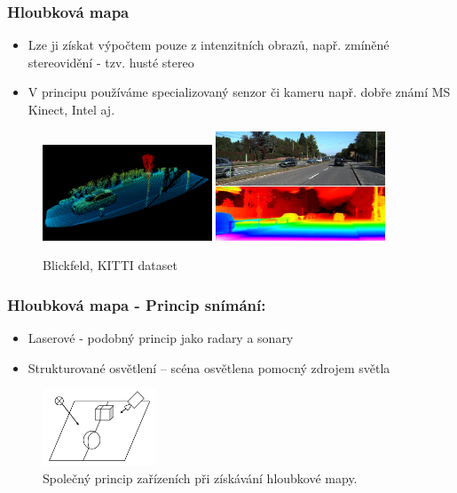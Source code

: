 \begin{frame}
\frametitle{Hloubková mapa}
\begin{itemize}
	\item Lze ji získat výpočtem pouze z intenzitních obrazů, např. zmíněné stereovidění - tzv. husté stereo
	\item V principu používáme specializovaný senzor či kameru např. dobře známí MS Kinect, Intel aj. 

\end{itemize}
	\begin{figure}[!ht]
	\centering
	\includegraphics[width = 0.45\textwidth]{./lidar-car}
	\includegraphics[width = 0.45\textwidth]{./kitti}
	\caption{Blickfeld, KITTI dataset}
	\end{figure}
\end{frame}

\begin{frame}
\frametitle{Hloubková mapa - Princip snímání:}
\begin{itemize}
\item Laserové - podobný princip jako radary a sonary 
\item Strukturované osvětlení – scéna osvětlena pomocný zdrojem světla
\end{itemize}
	\begin{figure}[!ht]
	\centering
	\includegraphics[width = 0.3\textwidth]{./prouzek}
	\caption{Společný princip zařízeních při získávání hloubkové mapy.}
	\end{figure}
\end{frame}

